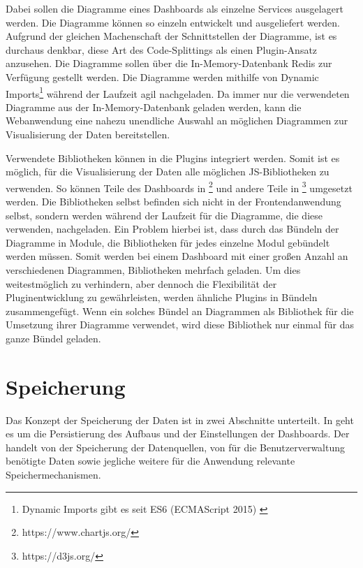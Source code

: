 Dabei sollen die Diagramme eines Dashboards als einzelne Services ausgelagert werden.
Die Diagramme können so einzeln entwickelt und ausgeliefert werden. Aufgrund der
gleichen Machenschaft der Schnittstellen der Diagramme, ist es durchaus denkbar, diese Art des Code-Splittings als
einen Plugin-Ansatz anzusehen. Die Diagramme sollen über die In-Memory-Datenbank
Redis zur Verfügung gestellt werden. Die Diagramme werden mithilfe
von Dynamic Imports\footnote{Dynamic Imports gibt es seit ES6 (ECMAScript 2015) \cite{DynamicImportsV8}}
während der Laufzeit agil nachgeladen. Da immer nur die verwendeten Diagramme aus der In-Memory-Datenbank
geladen werden, kann die Webanwendung eine nahezu unendliche Auswahl an möglichen Diagrammen zur Visualisierung
der Daten bereitstellen.

Verwendete Bibliotheken können in die Plugins integriert werden. Somit ist es möglich, für die Visualisierung
der Daten alle möglichen JS-Bibliotheken zu verwenden. So können Teile des Dashboards
in \footnote{https://www.chartjs.org/} und andere Teile in \footnote{https://d3js.org/}
umgesetzt werden. Die Bibliotheken selbst befinden sich nicht in der Frontendanwendung selbst,
sondern werden während der Laufzeit für die Diagramme, die diese verwenden, nachgeladen.
Ein Problem hierbei ist, dass durch das Bündeln der Diagramme in Module, die Bibliotheken für jedes einzelne
Modul gebündelt werden müssen. Somit werden bei einem Dashboard mit einer großen Anzahl an verschiedenen
Diagrammen, Bibliotheken mehrfach geladen. Um dies weitestmöglich zu verhindern, aber dennoch die Flexibilität
der Pluginentwicklung zu gewährleisten, werden ähnliche Plugins in Bündeln zusammengefügt. Wenn ein solches
Bündel an Diagrammen  als Bibliothek für die Umsetzung ihrer Diagramme verwendet, wird diese
Bibliothek nur einmal für das ganze Bündel geladen.

\section{Speicherung}
\label{sec:speicherung}
Das Konzept der Speicherung der Daten ist in zwei Abschnitte unterteilt.
In  geht es um die Persistierung des Aufbaus und der
Einstellungen der Dashboards. Der  handelt
von der Speicherung der Datenquellen, von für die Benutzerverwaltung benötigte Daten
sowie jegliche weitere für die Anwendung relevante Speichermechanismen.

